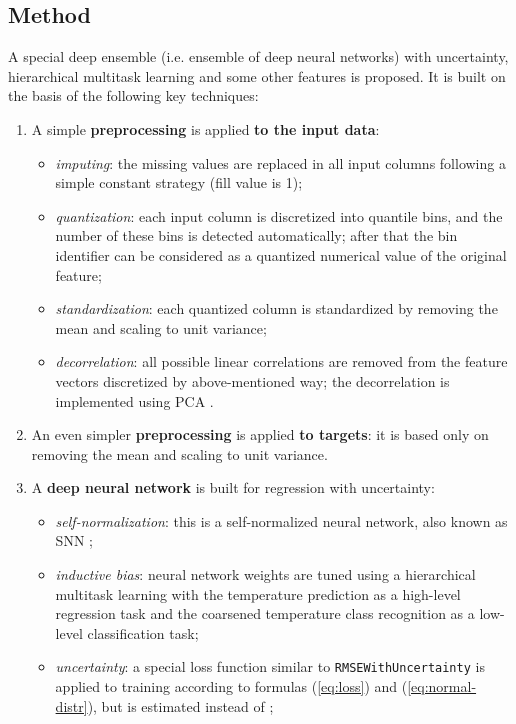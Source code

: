 \documentclass{article}
\begin{document}
\subsection{Method}

A special deep ensemble (i.e. ensemble of deep neural networks) with uncertainty, hierarchical multitask learning and some other features is proposed. It is built on the basis of the following key techniques:

\begin{enumerate}
    \item A simple \textbf{preprocessing} is applied \textbf{to the input data}:
        \begin{itemize} 
            \item \emph{imputing}: the missing values are replaced in all input columns following a simple constant strategy (fill value is 1);
            \item \emph{quantization}: each input column is discretized into quantile bins, and the number of these bins is detected automatically; after that the bin identifier can be considered as a quantized numerical value of the original feature; 
            \item \emph{standardization}: each quantized column is standardized by removing the mean and scaling to unit variance;
            \item \emph{decorrelation}: all possible linear correlations are removed from the feature vectors discretized by above-mentioned way; the decorrelation is implemented using PCA \cite{esbensen2002multivariate}.
        \end{itemize} 
    \item An even simpler \textbf{preprocessing} is applied \textbf{to targets}: it is based only on removing the mean and scaling to unit variance.
    \item A \textbf{deep neural network} is built for regression with uncertainty:
        \begin{itemize} 
            \item \emph{self-normalization}: this is a self-normalized neural network, also known as SNN \cite{Klambauer2017};
            \item \emph{inductive bias}: neural network weights are tuned using a hierarchical multitask learning with the temperature prediction as a high-level regression task and the coarsened temperature class recognition as a low-level classification task;
            \item \emph{uncertainty}: a special loss function similar to \verb+RMSEWithUncertainty+ \cite{Malinin2021gbtuncertainty} is applied to training according to formulas (\ref{eq:loss}) and (\ref{eq:normal-distr}), but  is estimated instead of ;

\end{itemize}
\end{enumerate}
\end{document}
